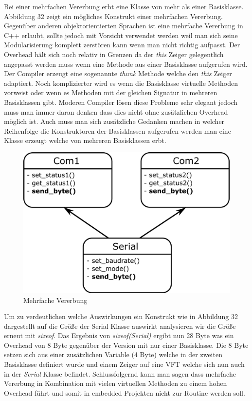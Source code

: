 \documentclass[MES,Master,ngerman]{twbook}%
\begin{document}
Bei einer mehrfachen Vererbung erbt eine Klasse von mehr als einer Basisklasse. Abbildung 32 zeigt ein mögliches Konstrukt einer mehrfachen Vererbung. Gegenüber anderen objektorientierten Sprachen ist eine mehrfache Vererbung in C++ erlaubt, sollte jedoch mit Vorsicht verwendet werden weil man sich seine Modularisierung komplett zerstören kann wenn man nicht richtig aufpasst. Der Overhead hält sich noch relativ in Grenzen da der \textit{this} Zeiger gelegentlich angepasst werden muss wenn eine Methode aus einer Basisklasse aufgerufen wird. Der Compiler erzeugt eine sogenannte \textit{thunk} Methode welche den \textit{this} Zeiger adaptiert. Noch komplizierter wird es wenn die Basisklasse virtuelle Methoden vorweist oder wenn es Methoden mit der gleichen Signatur in mehreren Basisklassen gibt. Moderen Compiler lösen diese Probleme sehr elegant jedoch muss man immer daran denken dass dies nicht ohne zusätzlichen Overhead möglich ist. Auch muss man sich zusätzliche Gedanken machen in welcher Reihenfolge die Konstruktoren der Basisklassen aufgerufen werden man eine Klasse erzeugt welche von mehreren Basisklassen erbt. \newpage
\begin{figure}[h]
	\centering
	\includegraphics[scale=0.65]{../Grafiken/Mehrfache_Vererbung.png}
	\caption{Mehrfache Vererbung}
	\label{fig:37}
\end{figure}

Um zu verdeutlichen welche Auswirkungen ein Konstrukt wie in Abbildung 32 dargestellt auf die Größe der Serial Klasse auswirkt  analysieren wir die Größe erneut mit \textit{sizeof}. Das Ergebnis von \textit{sizeof(Serial)} ergibt nun 28 Byte was ein Overhead von 8 Byte gegenüber der Version mit nur einer Basisklasse. Die 8 Byte setzen sich aus einer zusätzlichen Variable (4 Byte) welche in der zweiten Basisklasse definiert wurde und einem Zeiger auf eine VFT welche sich nun auch in der \textit{Serial} Klasse befindet. Schlussfolgernd kann man sagen dass mehrfache Vererbung in Kombination mit vielen virtuellen Methoden zu einem hohen Overhead führt und somit in embedded Projekten nicht zur Routine werden soll.
\end{document}

